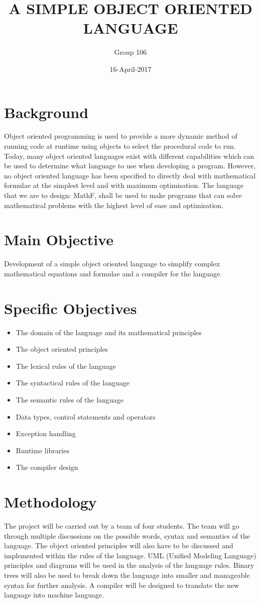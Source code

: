 \documentclass{article}
\begin{document}
\title{A SIMPLE OBJECT ORIENTED LANGUAGE}
\date{16-April-2017}
\author{Group 106}

\maketitle
\newpage

\section{Background}
Object oriented programming is used to provide a more dynamic method of running code at runtime using objects to select the procedural code to run. Today, many object oriented languages exist with different capabilities which can be used to determine what language to use when developing a program. However, no object oriented language has been specified to directly deal with mathematical formulae at the simplest level and with maximum optimisation. The language that we are to design: MathF, shall be used to make programs that can solve mathematical problems with the highest level of ease and optimisation.

\section{Main Objective}
Development of a simple object oriented language to simplify complex mathematical equations and formulae and a compiler for the language.

\section{Specific Objectives}
\begin{itemize}
\item
The domain of the language and its mathematical principles
\item
The object oriented principles
\item
The lexical rules of the language
\item
The syntactical rules of the language
\item
The semantic rules of the language
\item
Data types, control statements and operators
\item
Exception handling
\item
Runtime libraries
\item
The compiler design
\end{itemize}

\section{Methodology}
The project will be carried out by a team of four students. The team will go through multiple discussions on the possible words, syntax and semantics of the language. The object oriented principles will also have to be discussed and implemented within the rules of the language. UML (Unified Modeling Language) principles and diagrams will be used in the analysis of the language rules. Binary trees will also be used to break down the language into smaller and manageable syntax for further analysis. A compiler will be designed to translate the new language into machine language.
\end{document}

